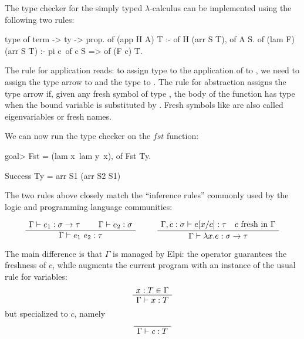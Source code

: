 \documentclass[a4paper, 11pt]{book}
\newenvironment{bprooftree}
  {\leavevmode\hbox\bgroup}
  {\DisplayProof\egroup}
\begin{document}


The type checker for the simply typed $\lambda$-calculus can be implemented
using the following two rules:

\begin{elpicode}
type of term -> ty -> prop.
of (app H A) T :- of H (arr S T), of A S.
of (lam F) (arr S T) :- pi c\ of c S => of (F c) T.
\end{elpicode}

The rule for application reads: to assign type  to the application of
 to , we need to assign the type  arrow  to
 and the type  to . The rule for abstraction assigns
the type  arrow  if, given any fresh symbol  of type
, the body of the function  has type  when the bound
variable is substituted by .
Fresh symbols like  are also called eigenvariables or fresh names.

We can now run the type checker on the $fst$ function:
\begin{elpicode}
goal> Fst = (lam x\ lam y\ x), of Fst Ty.

Success
  Ty = arr S1 (arr S2 S1)
\end{elpicode}

The two rules above closely match the ``inference rules'' commonly used by the
logic and programming language communities:
\label{inf:stlc}

$$
\begin{bprooftree}
  \AxiomC{$\Gamma \vdash e_1 : \sigma \to \tau$}
  \AxiomC{$\Gamma \vdash e_2 : \sigma$}
  \BinaryInfC{$\Gamma \vdash e_1~e_2 : \tau$}
\end{bprooftree}
\qquad
\begin{bprooftree}
  \AxiomC{$\Gamma, c : \sigma \vdash e[x/c] : \tau \quad c~\mathrm{fresh~in}~\Gamma$}
  \UnaryInfC{$\Gamma \vdash \lambda x.e : \sigma \to \tau$}
\end{bprooftree}
$$



The main difference is that $\Gamma$ is managed by Elpi: the 
operator guarantees the freshness of $c$, while \elpi{=>} augments the
current program with an instance of the usual rule for variables:
$$
\begin{bprooftree}
  \AxiomC{$x : T \in \Gamma$}
  \UnaryInfC{$\Gamma \vdash x : T$}
\end{bprooftree}
$$
\noindent but specialized to $c$, namely
$$
\begin{bprooftree}
  \AxiomC{}
  \UnaryInfC{$\Gamma \vdash c : T$}
\end{bprooftree}
$$
\end{document}
